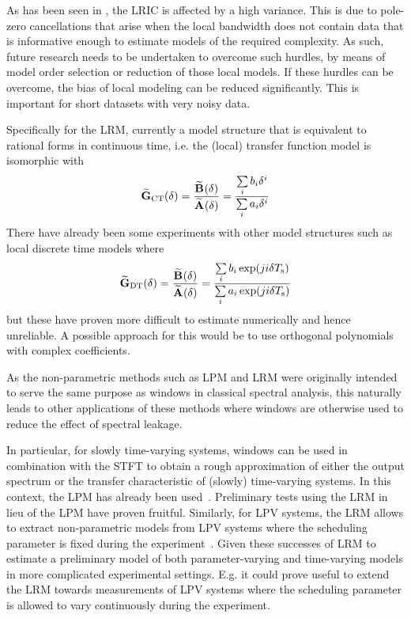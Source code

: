     As has been seen in , the \gls{LRIC} is affected by a high variance.
    This is due to pole-zero cancellations that arise when the local bandwidth does not contain data that is informative enough to estimate models of the required complexity.
    As such, future research needs to be undertaken to overcome such hurdles, by means of model order selection or reduction of those local models.
    If these hurdles can be overcome, the bias of local modeling can be reduced significantly.
    This is important for short datasets with very noisy data.

    Specifically for the \gls{LRM}, currently a model structure that is equivalent to rational forms in continuous time, i.e. the (local) transfer function model is isomorphic with
    \begin{equation}
      \LocalModel[\CT]{G}(\dW) 
      = \frac{\LocalModel{B}(\dW)}{\LocalModel{A}(\dW)}
      = \frac{\Sum_i  b_i \dW^{i}}{\Sum_i  a_i \dW^{i}}
    \end{equation}
    There have already been some experiments with other model structures such as local discrete time models where
    \begin{equation}
      \LocalModel[\DT]{G}(\dW) 
      = \frac{\LocalModel{B}(\dW)}{\LocalModel{A}(\dW)}
      = \frac{\Sum_i  b_i \exp (ji\dW\Ts)}{\Sum_i  a_i \exp (ji\dW\Ts) }
    \end{equation}
    but these have proven more difficult to estimate numerically and hence unreliable.
    A possible approach for this would be to use orthogonal polynomials~\citep{Forsythe1957,Bultheel2005} with complex coefficients.

    As the non-parametric methods such as \gls{LPM} and \gls{LRM} were originally intended to serve the same purpose as windows in classical spectral analysis, this naturally leads to other applications of these methods where windows are otherwise used to reduce the effect of spectral leakage.

    In particular, for slowly time-varying systems, windows can be used in combination with the \gls{STFT} to obtain a rough approximation of either the output spectrum or the transfer characteristic of (slowly) time-varying systems.
    In this context, the \gls{LPM} has already been used~\citep{Lataire2012}.
    Preliminary tests using the \gls{LRM} in lieu of the \gls{LPM} have proven fruitful.
    Similarly, for \gls{LPV} systems, the \gls{LRM} allows to extract non-parametric models from \gls{LPV} systems where the scheduling parameter is fixed during the experiment~\citep{vanderMaas2015CDC}.
    Given these successes of \gls{LRM} to estimate a preliminary model of both parameter-varying and time-varying models in more complicated experimental settings.
    E.g. it could prove useful to extend the \gls{LRM} towards measurements of \gls{LPV} systems where the scheduling parameter is allowed to vary continuously during the experiment.

